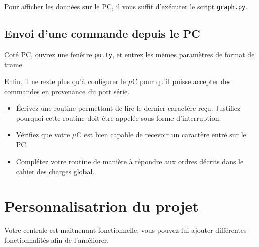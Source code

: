 \documentclass[11pt,a4paper]{article}
\theoremstyle{definition}%
\begin{document}
Pour afficher les données sur le PC, il vous suffit d'exécuter le script \texttt{graph.py}.



\subsection{Envoi d'une commande depuis le PC}

Coté PC, ouvrez une fenêtre \texttt{putty}, et entrez les mêmes paramètres de format de trame.


Enfin, il ne reste plus qu’à configurer le $\mu$C pour qu’il puisse accepter des commandes en provenance du port série.
\begin{itemize}
	\item Écrivez une routine permettant de lire le dernier caractère reçu.
	Justifiez pourquoi cette routine doit être appelée sous forme d’interruption.
	\item Vérifiez que votre $\mu$C est bien capable de recevoir un caractère entré sur le PC.
	\item Complétez votre routine de manière à répondre aux ordres décrits dans le cahier des charges global.
\end{itemize}









\section{Personnalisatrion du projet}
Votre centrale est maitnenant fonctionnelle, vous pouvez lui ajouter différentes fonctionnalités afin de l'améliorer.
\end{document}
